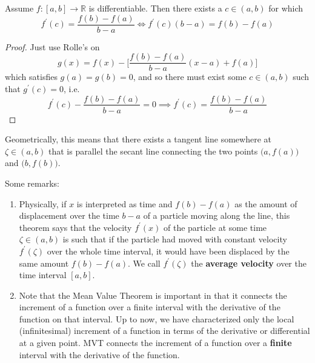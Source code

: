   \begin{theorem}
    Assume $f: [a, b] \to \mathbb{R}$ is differentiable. Then there exists a $c \in (a, b)$ for which 
    \begin{equation}
      f^\prime (c) = \frac{f(b) - f(a)}{b - a} \iff f^\prime (c) (b - a) = f(b) - f(a)
    \end{equation}
  \end{theorem}
  \begin{proof}
    Just use Rolle's on 
    \begin{equation}
      g(x) = f(x) - \bigg[ \frac{f(b) - f(a)}{b - a} (x - a) + f(a) \bigg]
    \end{equation}
    which satisfies $g(a) = g(b) = 0$, and so there must exist some $c \in (a, b)$ such that $g^\prime (c) = 0$, i.e. 
    \begin{equation}
      f^\prime (c) - \frac{f(b) - f(a)}{b - a} = 0 \implies f^\prime (c) = \frac{f(b) - f(a)}{b - a}
    \end{equation}
  \end{proof} 

  Geometrically, this means that there exists a tangent line somewhere at $\zeta \in (a, b)$ that is parallel the secant line connecting the two points $\big(a, f(a)\big)$ and $\big( b, f(b)\big)$. 

  Some remarks: 
  \begin{enumerate}
    \item Physically, if $x$ is interpreted as time and $f(b) - f(a)$ as the amount of displacement over the time $b-a$ of a particle moving along the line, this theorem says that the velocity $f^\prime (x)$ of the particle at some time $\zeta \in (a, b)$ is such that if the particle had moved with constant velocity $f^\prime (\zeta)$ over the whole time interval, it would have been displaced by the same amount $f(b) - f(a)$. We call $f^\prime (\zeta)$ the \textbf{average velocity} over the time interval $[a, b]$. 
    \item Note that the Mean Value Theorem is important in that it connects the increment of a function over a finite interval with the derivative of the function on that interval. Up to now, we have characterized only the local (infinitesimal) increment of a function in terms of the derivative or differential at a given point. MVT connects the increment of a function over a \textbf{finite} interval with the derivative of the function. 
  \end{enumerate}

